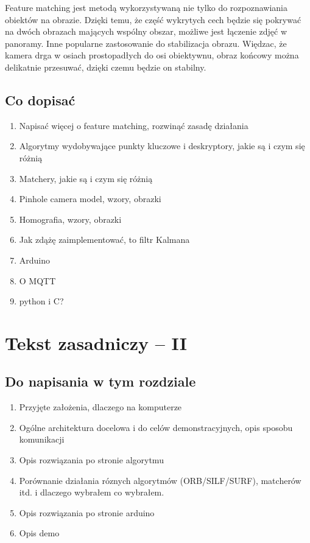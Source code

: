 \documentclass[12pt,twoside]{article}
\begin{document}
Feature matching jest metodą wykorzystywaną nie tylko do rozpoznawiania obiektów na obrazie. Dzięki temu, że część wykrytych cech będzie się pokrywać na dwóch obrazach mających wspólny obszar, możliwe jest łączenie zdjęć w panoramy. Inne popularne zastosowanie do stabilizacja obrazu. Więdzac, że kamera drga w osiach prostopadłych do osi obiektywnu, obraz końcowy można delikatnie przesuwać, dzięki czemu będzie on stabilny.


\subsection{Co dopisać}
\begin{enumerate}[label=\alph*), leftmargin=1.25cm]
\item Napisać więcej o feature matching, rozwinąć zasadę działania
\item Algorytmy wydobywające punkty kluczowe i deskryptory, jakie są i czym się różnią
\item Matchery, jakie są i czym się różnią
\item Pinhole camera model, wzory, obrazki
\item Homografia, wzory, obrazki
\item Jak zdążę zaimplementować, to filtr Kalmana
\item Arduino
\item O MQTT
\item python i C?
\end{enumerate}

\clearpage	

\section{Tekst zasadniczy -- II}

\subsection{Do napisania w tym rozdziale}
\begin{enumerate}[label=\alph*), leftmargin=1.25cm]
\item Przyjęte założenia, dlaczego na komputerze
\item Ogólne architektura docelowa i do celów demonstracyjnych, opis sposobu komunikacji
\item Opis rozwiązania po stronie algorytmu 
\item Porównanie działania róznych algorytmów (ORB/SILF/SURF), matcherów itd. i dlaczego wybrałem co wybrałem.
\item Opis rozwiązania po stronie arduino
\item Opis demo
\end{enumerate}
\end{document}
